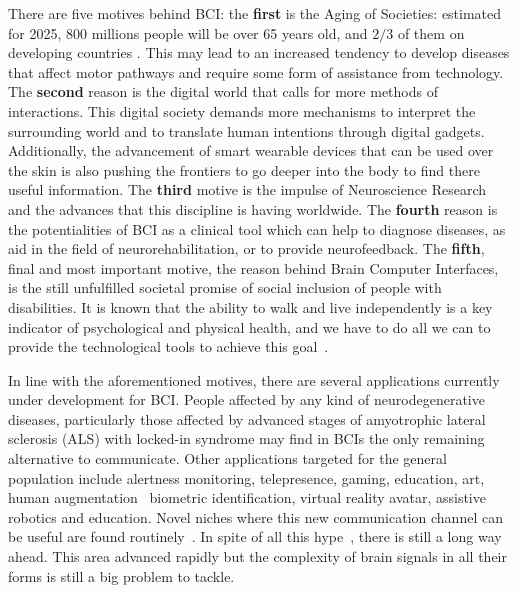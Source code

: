 
There are five motives behind BCI: the \textbf{first} is the Aging of Societies: estimated for 2025, 800 millions people will be over 65 years old, and $2/3$ of them on developing countries \cite{Lloyd-Sherlock2000}.  This may lead to an increased tendency to develop diseases that affect motor pathways and require some form of assistance from technology.  The \textbf{second} reason is the digital world that calls for more methods of interactions. This digital society demands more mechanisms to interpret the surrounding world and to translate human intentions through digital gadgets.  Additionally, the advancement of smart wearable devices that can be used over the skin is also pushing the frontiers to go deeper into the body to find there useful information.  The \textbf{third} motive is the impulse of Neuroscience Research and the advances that this discipline is having worldwide.  The \textbf{fourth} reason is the potentialities of BCI as a clinical tool which can help to diagnose diseases, as aid in the field of neurorehabilitation,  or to provide neurofeedback.  The \textbf{fifth}, final and most important motive, the reason behind Brain Computer Interfaces, is the still unfulfilled societal promise of social inclusion of people with disabilities.  It is known that the ability to walk and live independently is a key indicator of psychological and physical health, and we have to do all we can to provide the technological tools to achieve this goal~\cite{Rao2013,Clerc2016,WolpawJonathanR2012,Huggins2015}. 

In line with the aforementioned motives, there are several applications currently under development for BCI.  People affected by any kind of neurodegenerative diseases, particularly those affected by advanced stages of amyotrophic lateral sclerosis (ALS) with locked-in syndrome may find in BCIs the only remaining alternative to communicate. Other applications targeted for the general population include alertness monitoring, telepresence, gaming, education, art, human augmentation~\cite{Yuste2017} biometric identification, virtual reality avatar, assistive robotics and education.  Novel niches where this new communication channel can be useful are found routinely~\cite{Nam2018}. In spite of all this hype~\cite{GartnerHype2016}, there is still a long way ahead.  This area advanced rapidly but the complexity of brain signals in all their forms is still a big problem to tackle.  

